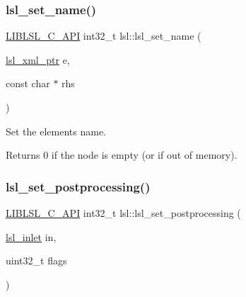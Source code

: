 \subsubsection{\texorpdfstring{lsl\+\_\+set\+\_\+name()}{lsl\_set\_name()}}
{\footnotesize\ttfamily \hyperlink{lsl__cpp_8h_aafd0ef1813e8be84a1420c4f1df64615}{L\+I\+B\+L\+S\+L\+\_\+\+C\+\_\+\+A\+PI} int32\+\_\+t lsl\+::lsl\+\_\+set\+\_\+name (\begin{DoxyParamCaption}\item[{\hyperlink{namespacelsl_a5edc7a49a1a1be1634fe6dce3d59c59b}{lsl\+\_\+xml\+\_\+ptr}}]{e,  }\item[{const char $\ast$}]{rhs }\end{DoxyParamCaption})}

Set the element\textquotesingle{}s name. \begin{DoxyReturn}{Returns}
0 if the node is empty (or if out of memory). 
\end{DoxyReturn}
\mbox{\label{namespacelsl_a36fe6c26cb8c696b658c87490d4c1059}} 
\subsubsection{\texorpdfstring{lsl\+\_\+set\+\_\+postprocessing()}{lsl\_set\_postprocessing()}}
{\footnotesize\ttfamily \hyperlink{lsl__cpp_8h_aafd0ef1813e8be84a1420c4f1df64615}{L\+I\+B\+L\+S\+L\+\_\+\+C\+\_\+\+A\+PI} int32\+\_\+t lsl\+::lsl\+\_\+set\+\_\+postprocessing (\begin{DoxyParamCaption}\item[{\hyperlink{namespacelsl_a884a3363cfcba75d7ce8f00c1c4c54f1}{lsl\+\_\+inlet}}]{in,  }\item[{uint32\+\_\+t}]{flags }\end{DoxyParamCaption})}

